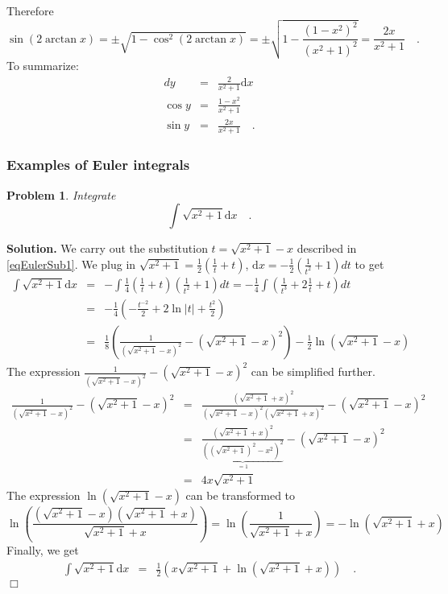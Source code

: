 \documentclass[12pt]{book}
\newcommand{\diff}{\text{d}}
\newenvironment{solution}{\textbf{Solution.} }{$\Box$}
\newtheorem{problem}{Problem}[section]
\begin{document}
Therefore 
\[\sin (2\arctan x)=\pm \sqrt{1-\cos^2(2\arctan x)}= \pm\sqrt{ 1-\frac{(1- x^2)^2}{(x^2+1)^2} }= \frac{2x}{x^2+1}\quad .
\]
To summarize:
\[
\begin{array}{rcl}
dy&=&\frac{2}{x^2+1}\diff x\\
\cos y&=& \frac{1- x^2}{x^2+1} \\
\sin y&=&\frac{2x}{x^2+1}\quad .
\end{array}
\] 

\subsubsection{Examples of Euler integrals}
\begin{problem}
Integrate 
\[
\int \sqrt{x^2+1}\diff x\quad .
\]
\end{problem}
\begin{solution}
We carry out the substitution $t=\sqrt{x^2+1}-x$ described in \ref{eqEulerSub1}. We plug in $\sqrt{x^2+1}=\frac{1}2\left(\frac 1 t +t\right)$, $\diff x=-\frac12 \left(\frac1{t^2} +1\right)dt$ to get
\[
\begin{array}{rcl}
\displaystyle\int \sqrt{x^2+1}\diff x&=&\displaystyle-\int  \frac14 \left(\frac1t +t\right)\left(\frac 1 {t^2} +1\right)dt=-\frac 1 4\int (\frac{1}{t^3}+2\frac{1}t+t)dt\\
&=&\displaystyle -\frac{1}4 \left(-\frac{t^{-2}}{2}+2\ln|t|+\frac{t^2}2 \right)\\
&=&\displaystyle\frac{1}{8} \left(\frac{1}{(\sqrt{x^2+1}-x)^2}- (\sqrt{x^2+1}-x)^2\right)-\frac12 \ln (\sqrt{x^2+1}-x)
\end{array}
\]
The expression $\frac{1}{(\sqrt{x^2+1}-x)^2}- (\sqrt{x^2+1}-x)^2$ can be simplified further.  
\[\begin{array}{rcl}
\displaystyle\frac{1}{(\sqrt{x^2+1}-x)^2}- (\sqrt{x^2+1}-x)^2&=&\displaystyle
\frac{(\sqrt{x^2+1}+x)^2}{(\sqrt{x^2+1}-x)^2  (\sqrt{x^2+1}+x)^2 }- (\sqrt{x^2+1}-x)^2 \\&=&\displaystyle \frac{(\sqrt{x^2+1}+x)^2}{\underbrace{((\sqrt{x^2+1})^2-x^2)^2}_{=1} }- (\sqrt{x^2+1}-x)^2 \\
&=&\displaystyle 4x\sqrt{x^2+1}
\end{array}
\]
The expression $\ln (\sqrt{x^2+1}-x)$ can be transformed to 
\[
\ln \left(\frac{(\sqrt{x^2+1}-x)(\sqrt{x^2+1}+x)}{\sqrt{x^2+1}+x}\right)=\ln \left(\frac{1}{\sqrt{x^2+1}+x}\right)= -\ln (\sqrt{x^2+1}+x)
\]
Finally, we get 
\[
\begin{array}{rcl}
\displaystyle \int \sqrt{x^2+1}\diff x&=&\frac{1}2\left(x\sqrt{x^2+1}+\ln (\sqrt{x^2+1}+x) \right)\quad .
\end{array}
\]
\end{solution}
\end{document}
